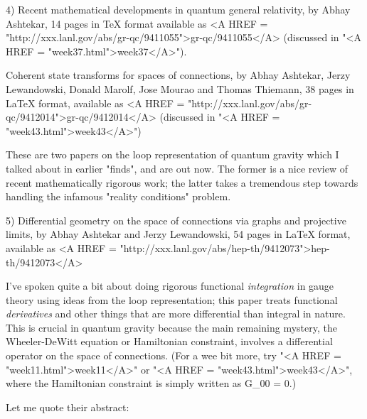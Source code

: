 4) Recent mathematical developments in quantum general relativity, by
Abhay Ashtekar, 14 pages in TeX format available as <A HREF = "http://xxx.lanl.gov/abs/gr-qc/9411055">gr-qc/9411055</A>
(discussed in "<A HREF = "week37.html">week37</A>").

Coherent state transforms for spaces of connections, by 
Abhay Ashtekar, Jerzy Lewandowski, Donald Marolf, Jose Mourao and
Thomas Thiemann, 38 pages in LaTeX format, available as <A HREF = "http://xxx.lanl.gov/abs/gr-qc/9412014">gr-qc/9412014</A>
(discussed in "<A HREF = "week43.html">week43</A>")


These are two papers on the loop representation of quantum gravity which
I talked about in earlier "finds", and are out now.  The former is a
nice review of recent mathematically rigorous work; the latter takes a
tremendous step towards handling the infamous "reality conditions"
problem.  


5) Differential geometry on the space of connections via graphs and
projective limits, by Abhay Ashtekar and Jerzy Lewandowski, 54 pages in
LaTeX format, available as <A HREF = "http://xxx.lanl.gov/abs/hep-th/9412073">hep-th/9412073</A>


I've spoken quite a bit about doing rigorous functional \emph{integration} in
gauge theory using ideas from the loop representation; this paper treats
functional \emph{derivatives} and other things that are more differential
than integral in nature.  This is crucial in quantum gravity because the
main remaining mystery, the Wheeler-DeWitt equation or Hamiltonian
constraint, involves a differential operator on the space of connections.
(For a wee bit more, try "<A HREF = "week11.html">week11</A>" or "<A HREF = "week43.html">week43</A>", where the Hamiltonian
constraint is simply written as G_{00} = 0.)  

Let me quote their abstract:

